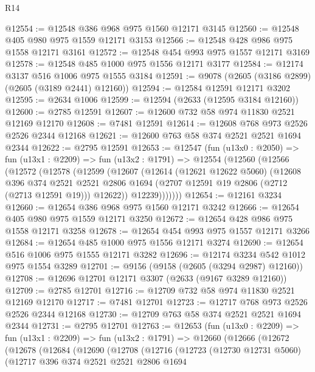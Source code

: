 \begin{lexlean}{R14}
\begin{coremodule}
@12554 := @12548 @386 @968 @975 @1560 @12171 @3145
@12560 := @12548 @405 @980 @975 @1559 @12171 @3153
@12566 := @12548 @428 @986 @975 @1558 @12171 @3161
@12572 := @12548 @454 @993 @975 @1557 @12171 @3169
@12578 := @12548 @485 @1000 @975 @1556 @12171 @3177
@12584 := @12174 @3137 @516 @1006 @975 @1555 @3184
@12591 := @9078 (@2605 (@3186 @2899) (@2605 (@3189 @2441) @12160))
@12594 := @12584 @12591 @12171 @3202
@12595 := @2634 @1006
@12599 := @12594 (@2633 (@12595 @3184 @12160))
@12600 := @2785 @12591
@12607 := @12600 @732 @58 @974 @11830 @2521 @12169 @12170
@12608 := @7481 @12591
@12614 := @12608 @768 @973 @2526 @2526 @2344 @12168
@12621 := @12600 @763 @58 @374 @2521 @2521 @1694 @2344
@12622 := @2795 @12591
@12653 := @12547
    (fun (u13x0 : @2050) =>
    fun (u13x1 : @2209) =>
    fun (u13x2 : @1791) =>
    @12554
      (@12560
        (@12566
          (@12572
            (@12578
              (@12599
                (@12607
                  (@12614
                    (@12621 @12622 @5060)
                    (@12608
                      @396
                      @374
                      @2521
                      @2521
                      @2806
                      @1694
                      (@2707 @12591 @19 @2806 (@2712 (@2713 @12591 @19)))
                      @12622))
                  @12239)))))))
@12654 := @12161 @3234
@12660 := @12654 @386 @968 @975 @1560 @12171 @3242
@12666 := @12654 @405 @980 @975 @1559 @12171 @3250
@12672 := @12654 @428 @986 @975 @1558 @12171 @3258
@12678 := @12654 @454 @993 @975 @1557 @12171 @3266
@12684 := @12654 @485 @1000 @975 @1556 @12171 @3274
@12690 := @12654 @516 @1006 @975 @1555 @12171 @3282
@12696 := @12174 @3234 @542 @1012 @975 @1554 @3289
@12701 := @9156 (@9158 (@2605 (@3294 @2987) @12160))
@12708 := @12696 @12701 @12171 @3307 (@2633 (@9167 @3289 @12160))
@12709 := @2785 @12701
@12716 := @12709 @732 @58 @974 @11830 @2521 @12169 @12170
@12717 := @7481 @12701
@12723 := @12717 @768 @973 @2526 @2526 @2344 @12168
@12730 := @12709 @763 @58 @374 @2521 @2521 @1694 @2344
@12731 := @2795 @12701
@12763 := @12653
    (fun (u13x0 : @2209) =>
    fun (u13x1 : @2209) =>
    fun (u13x2 : @1791) =>
    @12660
      (@12666
        (@12672
          (@12678
            (@12684
              (@12690
                (@12708
                  (@12716
                    (@12723
                      (@12730 @12731 @5060)
                      (@12717
                        @396
                        @374
                        @2521
                        @2521
                        @2806
                        @1694

\end{coremodule}
\end{lexlean}
